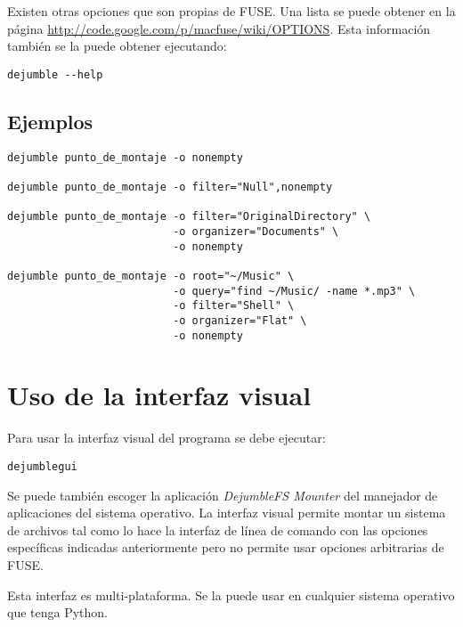 Existen otras opciones que son propias de FUSE. Una lista se puede obtener en la página \url{http://code.google.com/p/macfuse/wiki/OPTIONS}. Esta información también se la puede obtener ejecutando:

\begin{verbatim}
dejumble --help
\end{verbatim}

\subsection{Ejemplos}

\begin{verbatim}
dejumble punto_de_montaje -o nonempty

dejumble punto_de_montaje -o filter="Null",nonempty

dejumble punto_de_montaje -o filter="OriginalDirectory" \
                          -o organizer="Documents" \
                          -o nonempty

dejumble punto_de_montaje -o root="~/Music" \
                          -o query="find ~/Music/ -name *.mp3" \
                          -o filter="Shell" \
                          -o organizer="Flat" \
                          -o nonempty
\end{verbatim}


\section{Uso de la interfaz visual}

Para usar la interfaz visual del programa se debe ejecutar:

\begin{verbatim}
dejumblegui
\end{verbatim}

Se puede también escoger la aplicación \textit{DejumbleFS Mounter} del manejador de aplicaciones del sistema operativo. La interfaz visual permite montar un sistema de archivos tal como lo hace la interfaz de línea de comando con las opciones específicas indicadas anteriormente pero no permite usar opciones arbitrarias de FUSE.


Esta interfaz es multi-plataforma. Se la puede usar en cualquier sistema operativo que tenga Python.


